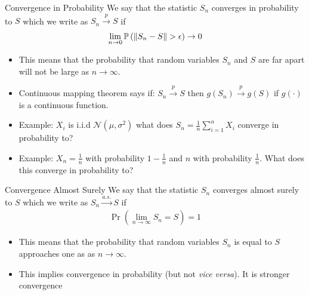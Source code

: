 \begin{frame}{Convergence in Probability}
We say that the statistic $S_n$ \alert{converges in probability} to $S$ which we write as $S_n \overset{p}{\to} S$ if
\begin{align*}
\lim_{n \rightarrow 0} \mathbb{P} \left( \lVert S_n - S\rVert > \epsilon \right) \rightarrow 0
\end{align*}
\begin{itemize}
	\item This means that the \alert{probability} that random variables $S_n$ and $S$ are far apart will not be large as $n\rightarrow \infty$.
	\item Continuous mapping theorem says if: $S_n \overset{p}{\to} S$ then $g(S_n) \overset{p}{\to} g(S)$ if $g(\cdot)$ is a continuous function.
	\item Example: $X_i$ is i.i.d $\mathcal{N}(\mu,\sigma^2)$ what does $S_n = \frac{1}{n} \sum_{i=1}^n X_i$ converge in probability to?
	\item Example: $X_n = \frac{1}{n}$ with probability $1-\frac{1}{n}$ and $n$ with probability $\frac{1}{n}$. What does this converge in probability to?
\end{itemize}
\end{frame}

\begin{frame}{Convergence Almost Surely}
We say that the statistic $S_n$ \alert{converges almost surely} to $S$ which we write as $S_n \overset{a.s.}{\to} S$ if
\begin{align*}
\Pr \left( \lim_{n\rightarrow \infty} S_n = S \right)=1
\end{align*}
\begin{itemize}
	\item This means that the \alert{probability} that random variables $S_n$ is equal to $S$ approaches one as as $n\rightarrow \infty$.
	\item This implies \alert{convergence in probability} (but not \textit{vice versa}). It is \alert{stronger convergence}
\end{itemize}
\end{frame}



